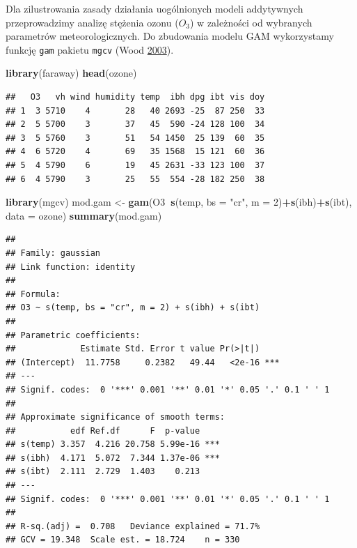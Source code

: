 \documentclass[
]{book}
\newenvironment{Shaded}{\begin{snugshade}}{\end{snugshade}}
\newcommand{\DataTypeTok}[1]{\textcolor[rgb]{0.13,0.29,0.53}{#1}}
\newcommand{\DecValTok}[1]{\textcolor[rgb]{0.00,0.00,0.81}{#1}}
\newcommand{\KeywordTok}[1]{\textcolor[rgb]{0.13,0.29,0.53}{\textbf{#1}}}
\newcommand{\NormalTok}[1]{#1}
\newcommand{\OperatorTok}[1]{\textcolor[rgb]{0.81,0.36,0.00}{\textbf{#1}}}
\newcommand{\StringTok}[1]{\textcolor[rgb]{0.31,0.60,0.02}{#1}}
\theoremstyle{plain}
\theoremstyle{definition}
\theoremstyle{definition}
\theoremstyle{definition}
\theoremstyle{definition}
\theoremstyle{remark}
\let\BeginKnitrBlock\begin \let\EndKnitrBlock\end
\begin{document}
\BeginKnitrBlock{example}
\protect\hypertarget{exm:gam}{}{\label{exm:gam} }Dla zilustrowania zasady działania uogólnionych modeli addytywnych przeprowadzimy analizę stężenia ozonu (\(O_3\)) w zależności od wybranych parametrów meteorologicznych. Do zbudowania modelu GAM wykorzystamy funkcję \texttt{gam} pakietu \texttt{mgcv} (Wood \protect\hyperlink{ref-R-mgcv}{2003}).
\EndKnitrBlock{example}

\begin{Shaded}
\begin{Highlighting}[]
\KeywordTok{library}\NormalTok{(faraway)}
\KeywordTok{head}\NormalTok{(ozone)}
\end{Highlighting}
\end{Shaded}

\begin{verbatim}
##   O3   vh wind humidity temp  ibh dpg ibt vis doy
## 1  3 5710    4       28   40 2693 -25  87 250  33
## 2  5 5700    3       37   45  590 -24 128 100  34
## 3  5 5760    3       51   54 1450  25 139  60  35
## 4  6 5720    4       69   35 1568  15 121  60  36
## 5  4 5790    6       19   45 2631 -33 123 100  37
## 6  4 5790    3       25   55  554 -28 182 250  38
\end{verbatim}

\begin{Shaded}
\begin{Highlighting}[]
\KeywordTok{library}\NormalTok{(mgcv)}
\NormalTok{mod.gam <-}\StringTok{ }\KeywordTok{gam}\NormalTok{(O3}\OperatorTok{~}\KeywordTok{s}\NormalTok{(temp, }\DataTypeTok{bs =} \StringTok{"cr"}\NormalTok{, }\DataTypeTok{m =} \DecValTok{2}\NormalTok{)}\OperatorTok{+}\KeywordTok{s}\NormalTok{(ibh)}\OperatorTok{+}\KeywordTok{s}\NormalTok{(ibt), }\DataTypeTok{data =}\NormalTok{ ozone)}
\KeywordTok{summary}\NormalTok{(mod.gam)}
\end{Highlighting}
\end{Shaded}

\begin{verbatim}
## 
## Family: gaussian 
## Link function: identity 
## 
## Formula:
## O3 ~ s(temp, bs = "cr", m = 2) + s(ibh) + s(ibt)
## 
## Parametric coefficients:
##             Estimate Std. Error t value Pr(>|t|)    
## (Intercept)  11.7758     0.2382   49.44   <2e-16 ***
## ---
## Signif. codes:  0 '***' 0.001 '**' 0.01 '*' 0.05 '.' 0.1 ' ' 1
## 
## Approximate significance of smooth terms:
##           edf Ref.df      F  p-value    
## s(temp) 3.357  4.216 20.758 5.99e-16 ***
## s(ibh)  4.171  5.072  7.344 1.37e-06 ***
## s(ibt)  2.111  2.729  1.403    0.213    
## ---
## Signif. codes:  0 '***' 0.001 '**' 0.01 '*' 0.05 '.' 0.1 ' ' 1
## 
## R-sq.(adj) =  0.708   Deviance explained = 71.7%
## GCV = 19.348  Scale est. = 18.724    n = 330
\end{verbatim}
\end{document}
